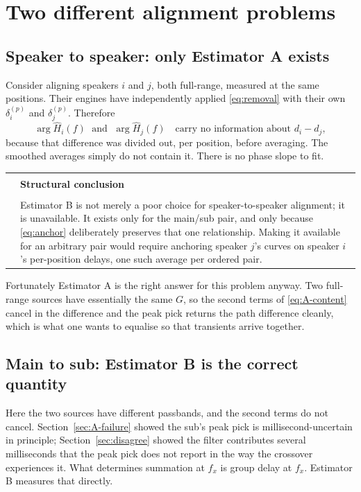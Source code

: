 \documentclass[11pt,a4paper]{article}
\makeatletter
\newenvironment{remark}[1]
  {\par\medskip\noindent\begin{tabular}{@{}p{0.03\textwidth}p{0.93\textwidth}@{}}
   \textcolor{smtblue}{\rule{2pt}{\baselineskip}} & \textbf{#1}\\[2pt] & \ignorespaces}
  {\end{tabular}\par\medskip}
\makeatother
\begin{document}
\section{Two different alignment problems}
\label{sec:twoproblems}

\subsection{Speaker to speaker: only Estimator A exists}

Consider aligning speakers $i$ and $j$, both full-range, measured at the same
positions. Their engines have independently applied \eqref{eq:removal} with
their own $\delta_i^{(p)}$ and $\delta_j^{(p)}$. Therefore
%
\begin{equation}
  \arg \hat H_i(f) \;\text{ and }\; \arg \hat H_j(f)
  \quad\text{carry no information about } d_i - d_j,
\end{equation}
%
because that difference was divided out, per position, before averaging. The
smoothed averages simply do not contain it. There is no phase slope to fit.

\begin{remark}{Structural conclusion}
Estimator B is not merely a poor choice for speaker-to-speaker alignment; it is
unavailable. It exists only for the main/sub pair, and only because
\eqref{eq:anchor} deliberately preserves that one relationship. Making it
available for an arbitrary pair would require anchoring speaker $j$'s curves on
speaker $i$'s per-position delays, one such average per ordered pair.
\end{remark}

Fortunately Estimator A is the right answer for this problem anyway. Two
full-range sources have essentially the same $G$, so the second terms of
\eqref{eq:A-content} cancel in the difference and the peak pick returns the path
difference cleanly, which is what one wants to equalise so that
transients arrive together.

\subsection{Main to sub: Estimator B is the correct quantity}

Here the two sources have different passbands, and the second terms do not
cancel. Section~\ref{sec:A-failure} showed the sub's peak pick is
millisecond-uncertain in principle; Section~\ref{sec:disagree} showed the filter
contributes several milliseconds that the peak pick does not report in the way
the crossover experiences it. What determines summation at $f_x$ is group delay
at $f_x$. Estimator B measures that directly.
\end{document}
